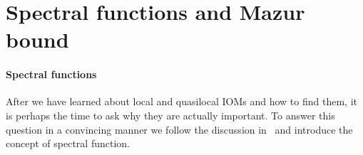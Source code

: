 
\section{Spectral functions and Mazur bound\label{sec:spectral function}}

\paragraph{Spectral functions}After we have learned about local and quasilocal IOMs and how to find them, it is perhaps the 
time to ask why they are actually important. To answer this question in a convincing manner we 
follow the discussion in~\textcite{Vidmar2021} and introduce the concept of spectral
function. 

